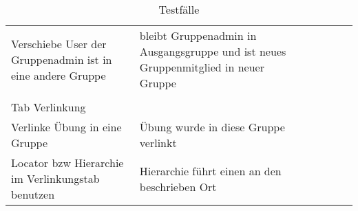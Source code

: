 \begin{table}[]
	\centering
	\caption{Testfälle}
	\label{my-label}
	\begin{tabular}{p{6cm}p{7cm}p{3cm}llll}Verschiebe User der Gruppenadmin ist in eine andere Gruppe                                                                           & bleibt Gruppenadmin in Ausgangsgruppe und ist neues Gruppenmitglied in neuer Gruppe                                                                              & \checkmark          &  &  &  \\
		&                                                                                                                                                                  &             &  &  &  \\
		Tab Verlinkung                                                                                                                       &                                                                                                                                                                  &             &  &  &  \\
		Verlinke Übung in eine Gruppe                                                                                                        & Übung wurde in diese Gruppe verlinkt                                                                                                                             & \checkmark           &  &  &  \\
		Locator bzw Hierarchie im Verlinkungstab benutzen                                                                                    & Hierarchie führt einen an den beschrieben Ort                                                                                                                    & \checkmark           &  &  &  \\
		

\end{tabular}
\end{table}
